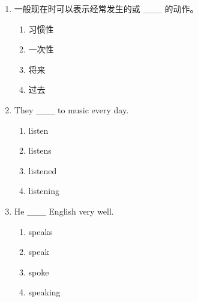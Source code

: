 \documentclass[11pt,a4paper]{ctexart}
\begin{document}
\begin{enumerate}[leftmargin=*,itemsep=4pt]
\begin{enumerate}[label=\Alph*.,leftmargin=2em,itemsep=1pt,topsep=2pt]
\item isn’t
\end{enumerate}
\item 一般现在时可以表示经常发生的或 \_\_\_ 的动作。
\begin{enumerate}[label=\Alph*.,leftmargin=2em,itemsep=1pt,topsep=2pt]
\item 习惯性
\item 一次性
\item 将来
\item 过去
\end{enumerate}
\item They \_\_\_ to music every day.
\begin{enumerate}[label=\Alph*.,leftmargin=2em,itemsep=1pt,topsep=2pt]
\item listen
\item listens
\item listened
\item listening
\end{enumerate}
\item He \_\_\_ English very well.
\begin{enumerate}[label=\Alph*.,leftmargin=2em,itemsep=1pt,topsep=2pt]
\item speaks
\item speak
\item spoke
\item speaking
\end{enumerate}
\end{enumerate}
\end{document}
